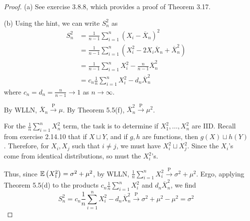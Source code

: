 \documentclass[a4paper]{article}
\begin{document}
\begin{proof}[Proof] 
\par (a) See exercise 3.8.8, which provides a proof of Theorem 3.17.
\vspace{12pt}
\par (b) Using the hint, we can write \(S^{2}_{n}\) as
\begin{align*}
	S^{2}_{n} & = \frac{1}{n-1} \sum_{i=1}^{n} \left( X_{i} - \overline{X}_{n} \right)^{2} \\
	 & = \frac{1}{n-1} \sum_{i=1}^{n} \left( X^{2}_{i} - 2X_{i} \overline{X}_{n} + \overline{X}^{2}_{n} \right)  \\ 
	 & = \frac{1}{n-1} \sum_{i=1}^{n} X^{2}_{i} - \frac{n}{n-1} \overline{X}^{2}_{n} \\
	 & = c_{n} \frac{1}{n} \sum_{i=1}^{n} X^{2}_{i} - d_{n} \overline{X}^{2}_{n}
\end{align*}
where \(c_{n} = d_{n} = \frac{n}{n-1} \rightarrow 1\) as \(n \rightarrow \infty\).

By WLLN, \(\overline{X}_{n} \xrightarrow{\text{ P }} \mu \). By Theorem 5.5(f), \(\overline{X}^{2}_{n} \xrightarrow{\text{ P }} \mu^{2}\). 

For the \(\frac{1}{n} \sum_{i=1}^{n} X^{2}_{n}\) term, the task is to determine if \(X^{2}_{1}, \dots, X^{2}_{n}\) are \textsf{IID}. Recall from exercise 2.14.10 that if \(X \sqcup Y\), and if \(g, h\) are functions, then \(g \left( X \right) \sqcup h \left( Y \right) \). Therefore, for \(X_{i}, X_{j}\) such that \(i \neq j\), we must have \(X^{2}_{i} \sqcup X^{2}_{j}\). Since the \(X_{i}\)'s come from identical distributions, so must the \(X^{2}_{i}\)'s.

Thus, since \(\mathbb{E}\left( X^{2}_{1} \right) = \sigma^{2} + \mu^{2}\), by WLLN, \(\frac{1}{n} \sum_{i=1}^{n} X^{2}_{i} \xrightarrow{\text{ P }} \sigma^{2} + \mu^{2}\). Ergo, applying Theorem 5.5(d) to the products \(c_{n} \frac{1}{n} \sum_{i=1}^{n} X^{2}_{i}\) and \(d_{n} \overline{X}^{2}_{n}\), we find
\[
	S^{2}_{n} = c_{n} \frac{1}{n} \sum_{i=1}^{n} X^{2}_{i} - d_{n} \overline{X}^{2}_{n} \xrightarrow{\text{ P }} \sigma^{2} + \mu^{2} - \mu^{2} = \sigma^{2}
\]
\end{proof}

\newpage
\end{document}
